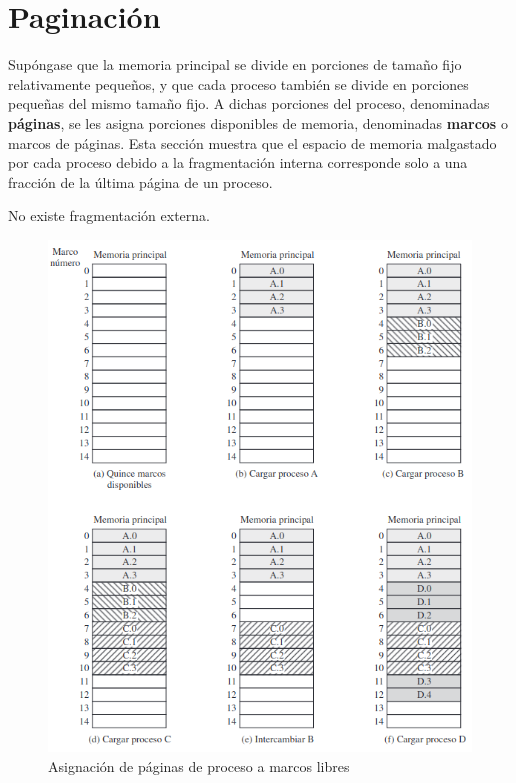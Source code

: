 \documentclass[12pt,a4paper]{article}
\begin{document}
\section{Paginación}
Supóngase que la memoria principal se divide en porciones de tamaño fijo relativamente pequeños, y que cada proceso también se divide en porciones pequeñas del mismo tamaño fijo. A dichas porciones del proceso, denominadas \textbf{páginas}, se les asigna porciones disponibles de memoria, denominadas \textbf{marcos} o marcos de páginas. Esta sección muestra que el espacio de memoria malgastado por cada proceso debido a la fragmentación interna corresponde solo a una fracción de la última página de un proceso.
\begin{tcolorbox}[colback=cyan!10, colframe=blue!70, title=Nota]
    No existe fragmentación externa.
\end{tcolorbox}
\begin{figure}[H]
    \centering
    \includegraphics[width=15cm]{marco.png}
    \caption{Asignación de páginas de proceso a marcos libres}
\end{figure}
\end{document}
